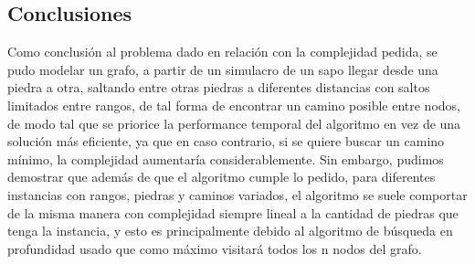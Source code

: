 \subsection{Conclusiones}
Como conclusión al problema dado en relación con la complejidad pedida, se pudo modelar un grafo, a partir de un simulacro de un sapo llegar desde una piedra a otra, saltando entre otras piedras a diferentes distancias con saltos limitados entre rangos, de tal forma de encontrar un camino posible entre nodos, de modo tal que se priorice la performance temporal del algoritmo en vez de una solución más eficiente, ya que en caso contrario, si se quiere buscar un camino mínimo, la complejidad aumentaría considerablemente. Sin embargo, pudimos demostrar que además de que el algoritmo cumple lo pedido, para diferentes instancias con rangos, piedras y caminos variados, el algoritmo se suele comportar de la misma manera con complejidad siempre lineal a la cantidad de piedras que tenga la instancia, y esto es principalmente debido al algoritmo de búsqueda en profundidad usado que como máximo visitará todos los n nodos del grafo. 
